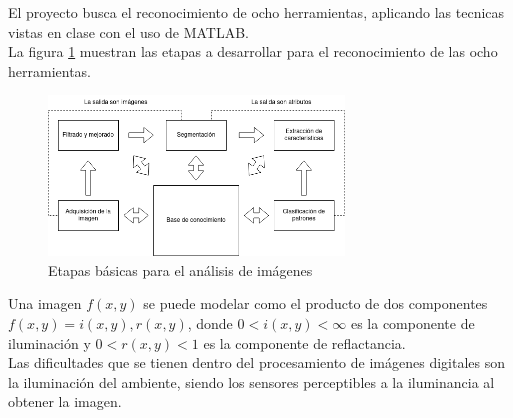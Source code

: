 \documentclass[a4paper, 11pt]{article}
\begin{document}
El proyecto busca el reconocimiento de ocho herramientas, aplicando las tecnicas vistas en clase con el uso de MATLAB.\\

La figura \ref{etapas_basicas} muestran las etapas a desarrollar para el reconocimiento de las ocho herramientas.\\

\begin{figure}[h]
\centering
\includegraphics[width=0.7\textwidth]{etapas_basicas}
\caption{Etapas básicas para el análisis de imágenes}
\label{etapas_basicas}
\end{figure}

Una imagen $f(x,y)$ se puede modelar como el producto de dos componentes $f(x,y) = i(x,y),r(x,y)$, donde $0<i(x,y)<\infty$ es la componente de iluminación y $0<r(x,y)<1$ es la componente de reflactancia.\\

Las dificultades que se tienen dentro del procesamiento de imágenes digitales son la iluminación del ambiente, siendo los sensores perceptibles a la iluminancia al obtener la imagen.\\





\end{document}
